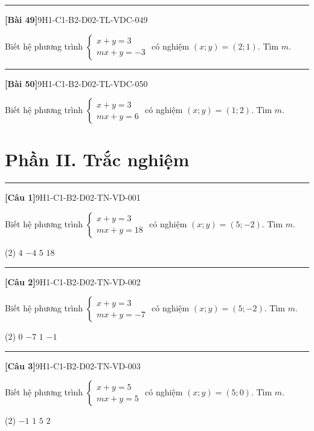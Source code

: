 \documentclass[12pt,a4paper]{article}
\newif\ifloigiai
\newenvironment{cauhoi}[2]{%
  \par\medskip\noindent\rule{\textwidth}{0.4pt}\par\nopagebreak
  \noindent\textbf{[#1]}\hfill{\scriptsize\ttfamily #2}\par\nopagebreak\smallskip}{\par}
\newcommand{\loigiai}[1]{\ifloigiai\par\smallskip\noindent\textit{Lời giải.} #1\par\fi}
\newcommand{\dapan}[1]{\ifloigiai\par\smallskip\noindent\textit{Đáp án:} \textbf{#1}\par\fi}
\begin{document}
\begin{cauhoi}{Bài 49}{9H1-C1-B2-D02-TL-VDC-049}
Biết hệ phương trình $\begin{cases}x+y=3\\ mx+y=-3\end{cases}$ có nghiệm $(x;y)=(2;1)$. Tìm $m$.
\loigiai{Thay $x=2$, $y=1$ vào phương trình thứ hai: $2 m+1=-3$ nên $m=\dfrac{-3-1}{2}=-2$.}
\end{cauhoi}
\begin{cauhoi}{Bài 50}{9H1-C1-B2-D02-TL-VDC-050}
Biết hệ phương trình $\begin{cases}x+y=3\\ mx+y=6\end{cases}$ có nghiệm $(x;y)=(1;2)$. Tìm $m$.
\loigiai{Thay $x=1$, $y=2$ vào phương trình thứ hai: $1 m+2=6$ nên $m=\dfrac{6-2}{1}=4$.}
\end{cauhoi}
\clearpage\section*{Phần II. Trắc nghiệm}
\begin{cauhoi}{Câu 1}{9H1-C1-B2-D02-TN-VD-001}
Biết hệ phương trình $\begin{cases}x+y=3\\ mx+y=18\end{cases}$ có nghiệm $(x;y)=(5;-2)$. Tìm $m$.
\begin{tasks}(2)
\task $4$
\task $-4$
\task $5$
\task $18$
\end{tasks}
\dapan{A}
\end{cauhoi}
\begin{cauhoi}{Câu 2}{9H1-C1-B2-D02-TN-VD-002}
Biết hệ phương trình $\begin{cases}x+y=3\\ mx+y=-7\end{cases}$ có nghiệm $(x;y)=(5;-2)$. Tìm $m$.
\begin{tasks}(2)
\task $0$
\task $-7$
\task $1$
\task $-1$
\end{tasks}
\dapan{D}
\end{cauhoi}
\begin{cauhoi}{Câu 3}{9H1-C1-B2-D02-TN-VD-003}
Biết hệ phương trình $\begin{cases}x+y=5\\ mx+y=5\end{cases}$ có nghiệm $(x;y)=(5;0)$. Tìm $m$.
\begin{tasks}(2)
\task $-1$
\task $1$
\task $5$
\task $2$
\end{tasks}
\dapan{B}
\end{cauhoi}
\end{document}
